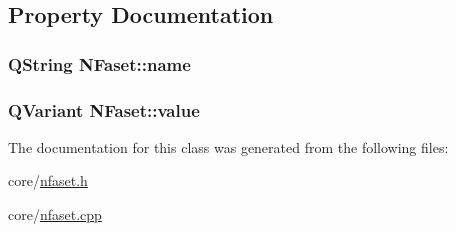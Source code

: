 \subsection{Property Documentation}
\hypertarget{class_n_faset_af9827ddd1a6919749df941ca06038025}{
\subsubsection[{name}]{\setlength{\rightskip}{0pt plus 5cm}QString NFaset::name}}
\label{class_n_faset_af9827ddd1a6919749df941ca06038025}
\hypertarget{class_n_faset_a6b0686534c292e0d363e1b136d5c43d5}{
\subsubsection[{value}]{\setlength{\rightskip}{0pt plus 5cm}QVariant NFaset::value}}
\label{class_n_faset_a6b0686534c292e0d363e1b136d5c43d5}


The documentation for this class was generated from the following files:\begin{DoxyCompactItemize}
\item 
core/\hyperlink{nfaset_8h}{nfaset.h}\item 
core/\hyperlink{nfaset_8cpp}{nfaset.cpp}\end{DoxyCompactItemize}
